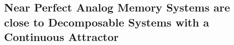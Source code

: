 \documentclass{article} %
\newcounter{ct}
\theoremstyle{definition}
\theoremstyle{remark}
\begin{document}




\subsection{Near Perfect Analog Memory Systems are close to Decomposable Systems with a Continuous Attractor}
\end{document}

